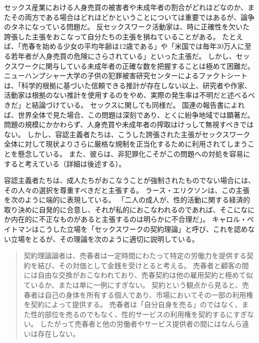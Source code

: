 \documentclass[paper=a4,book,openany]{jlreq}
\begin{document}
セックス産業における人身売買の被害者や未成年者の割合がどれほどなのか、またその両方である場合はどれほどかということについては重要ではあるが、論争のタネになっている問題だ。
反セックスワーク活動家は、時に正確性を欠いた誇張した主張をおこなって自分たちの主張を損ねていることがある。
たとえば、「売春を始める少女の平均年齢は12歳である」や「米国では毎年30万人に至る若年者が人身売買の危険にさらされている」といった主張だ\citep{hall14:_is_one_most_cited_statis}。
しかし、セックスワークに関与している未成年者の正確な数を把握することは極めて困難だ。
ニューハンプシャー大学の子供の犯罪被害研究センターによるファクトシートは、「科学的根拠に基づいた信頼できる推計が存在しない以上、研究者や作家、活動家は根拠のない推計を使用するのをやめ、実際の発生率は不明だと述べるべきだ」と結論づけている\citep{children08:_sex_traff_minor}。
セックスに関しても同様だ。
国連の報告書によれば、世界全体で見た場合、この問題は深刻であり、とくに紛争地域では顕著だ\citep{drugs18:_global_repor_traff_person}。
問題の規模にかかわらず、人身売買や未成年者の搾取はけっして無視すべきではない。
しかし、容認主義者たちは、こうした誇張された主張がセックスワーク全体に対して現状よりさらに厳格な規制を正当化するために利用されてしまうことを懸念している。
また、彼らは、非犯罪化こそがこの問題への対処を容易にすると考えている（詳細は後述する）。

容認主義者たちは、成人たちがおこなうことが強制されたものでない場合には、その人々の選択を尊重すべきだと主張する。
ラース・エリクソンは、この主張を次のように端的に表現している。
「二人の成人が、性的活動に関する経済的取り決めに自発的に合意し、それが私的におこなわれるのであれば、そこになにか内在的に不正なものがあると主張するのは明らかに不合理だ」\citep[pp.338--339]{ericsson80:_charg_again_prost}。
キャロル・ペイトマンはこうした立場を「セックスワークの契約理論」と呼び、これを認めない立場をとるが、その理論を次のように適切に説明している。

\begin{quote}
契約理論論者は、売春者は一定時間にわたって特定の労働力を提供する契約を結び、その対価として金銭を受けとると考える。
売春者と顧客の間には自由な交換がおこなわれており、売春契約は他の雇用契約と極めて似ているか、または単に一例にすぎない。
契約という観点から見ると、売春者は自己の身体を所有する個人であり、市場においてその一部の利用権を契約によって提供する。
売春者は「自分自身を売る」のではなく、また性的部位を売るのでもなく、性的サービスの利用権を契約するにすぎない。
したがって売春者と他の労働者やサービス提供者の間にはなんら違いは存在しない。
\citep[p.191]{pateman88:_sexual_contr}
\end{quote}
\end{document}
